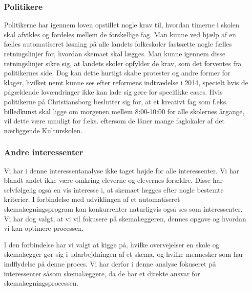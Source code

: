 \subsubsection{Politikere}
Politikerne har igennem loven opstillet nogle krav til, hvordan timerne i skolen skal afvikles og fordeles mellem de forskellige fag. Man kunne ved hjælp af en fælles automatiseret løsning på alle landets folkeskoler fastsætte nogle fælles retningslinjer for, hvordan skemaet skal lægges. Man kunne igennem disse retningslinjer sikre sig, at landets skoler opfylder de krav, som det forventes fra politikernes side. Dog kan dette hurtigt skabe protester og andre former for klager, hvilket nemt kunne ses efter reformens indtrædelse i 2014\cite{LaererBrok}, specielt hvis de pågældende lovændringer ikke kan lade sig gøre for specifikke cases. Hvis politikerne på Christiansborg beslutter sig for, at et kreativt fag som f.eks. billedkunst skal ligge om morgenen mellem 8:00-10:00 for alle skolernes årgange, vil dette være umuligt for f.eks. \school eftersom de låner mange faglokaler af det nærliggende Kulturskolen\cite{interview_Kaerby}. 

\subsubsection{Andre interessenter}
Vi har i denne interessentanalyse ikke taget højde for alle interessenter. Vi har blandt andet ikke være omkring eleverne og elevernes forældre. Disse har selvfølgelig også en vis interesse i, at skemaet lægges efter nogle bestemte kriterier. I forbindelse med udviklingen af et automatiseret skemalægningsprogram kan konkurrenter naturligvis også ses som interessenter. Vi har dog valgt, at vi vil fokusere på skemalæggeren, dennes opgave og hvordan vi kan optimere processen.

I den forbindelse har vi valgt at kigge på, hvilke overvejelser en skole og skemalægger gør sig i udarbejdningen af et skema, og hvilke mennesker som har indflydelse på denne proces. Vi har derfor i denne analyse fokuseret på interessenter såsom skemalæggere, da de har et direkte ansvar for skemalægningsprocessen.




